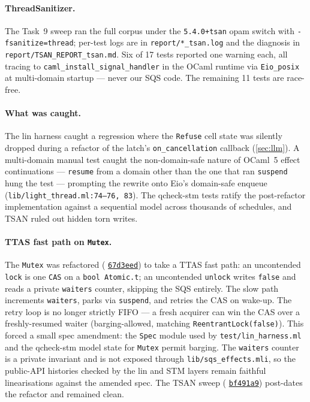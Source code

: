 \documentclass[11pt,a4paper]{article}
\newcommand{\commit}[1]{%
  \href{https://github.com/durwasa-chakraborty/CS6868_Concurrent_Programming_Project/commit/#1}%
       {\texttt{#1}}}
\begin{document}
\paragraph{ThreadSanitizer.}
The Task~9 sweep ran the full corpus under the \texttt{5.4.0+tsan}
opam switch with \texttt{-fsanitize=thread}; per-test logs are in
\texttt{report/*\_tsan.log} and the diagnosis in
\texttt{report/TSAN\_REPORT\_tsan.md}. Six of 17 tests reported one
warning each, all tracing to \texttt{caml\_install\_signal\_handler}
in the OCaml runtime via \texttt{Eio\_posix} at multi-domain startup
--- never our SQS code. The remaining 11 tests are race-free.

\paragraph{What was caught.}
\label{sec:tasks-bugs}
The lin harness caught a regression where the \texttt{Refuse} cell
state was silently dropped during a refactor of the latch's
\texttt{on\_cancellation} callback (\cref{sec:llm}). A multi-domain
manual test caught the non-domain-safe nature of OCaml~5 effect
continuations --- \texttt{resume} from a domain other than the one
that ran \texttt{suspend} hung the test --- prompting the rewrite onto
Eio's domain-safe enqueue (\texttt{lib/light\_thread.ml:74--76, 83}).
The qcheck-stm tests ratify the post-refactor implementation against
a sequential model across thousands of schedules, and TSAN ruled out
hidden torn writes.

\paragraph{TTAS fast path on \texttt{Mutex}.}
\label{sec:tasks-test-ttas}
The \texttt{Mutex} was refactored (\commit{67d3eed}) to take a TTAS
fast path: an uncontended \texttt{lock} is one \texttt{CAS} on a
\texttt{bool Atomic.t}; an uncontended \texttt{unlock} writes
\texttt{false} and reads a private \texttt{waiters} counter, skipping
the SQS entirely. The slow path increments \texttt{waiters}, parks via
\texttt{suspend}, and retries the CAS on wake-up. The retry loop is
no longer strictly FIFO --- a fresh acquirer can win the CAS over a
freshly-resumed waiter (barging-allowed, matching
\texttt{ReentrantLock(false)}). This forced a small spec amendment:
the \texttt{Spec} module used by \texttt{test/lin\_harness.ml} and the
qcheck-stm model state for \texttt{Mutex} permit barging. The
\texttt{waiters} counter is a private invariant and is not exposed
through \texttt{lib/sqs\_effects.mli}, so the public-API histories
checked by the lin and STM layers remain faithful linearisations
against the amended spec. The TSAN sweep (\commit{bf491a9})
post-dates the refactor and remained clean.
\end{document}
